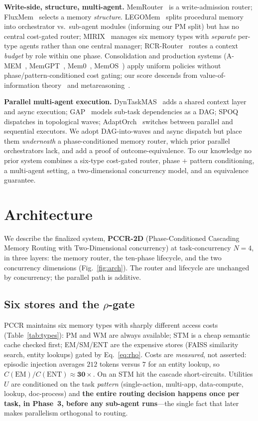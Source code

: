 \documentclass[10pt,twocolumn]{article}
\begin{document}
\textbf{Write-side, structure, multi-agent.} MemRouter~\cite{memrouter} is a write-admission router;
FluxMem~\cite{fluxmem} selects a memory \emph{structure}. LEGOMem~\cite{legomem} splits procedural
memory into orchestrator vs.\ sub-agent modules (informing our PM split) but has no central cost-gated
router; MIRIX~\cite{mirix} manages six memory types with \emph{separate} per-type agents rather than
one central manager; RCR-Router~\cite{rcr} routes a context \emph{budget} by role within one phase.
Consolidation and production systems (A-MEM~\cite{amem}, MemGPT~\cite{memgpt}, Mem0~\cite{mem0},
MemOS~\cite{memos}) apply uniform policies without phase/pattern-conditioned cost gating; our score
descends from value-of-information theory~\cite{voi} and metareasoning~\cite{meta}.

\textbf{Parallel multi-agent execution.} DynTaskMAS~\cite{dyntaskmas} adds a shared context layer and
async execution; GAP~\cite{gap} models sub-task dependencies as a DAG; SPOQ~\cite{spoq} dispatches in
topological waves; AdaptOrch~\cite{adaptorch} switches between parallel and sequential executors. We
adopt DAG-into-waves and async dispatch but place them \emph{underneath} a phase-conditioned memory
router, which prior parallel orchestrators lack, and add a proof of outcome-equivalence. To our
knowledge no prior system combines a six-type cost-gated router, phase $+$ pattern conditioning, a
multi-agent setting, a two-dimensional concurrency model, and an equivalence guarantee.

\section{Architecture}\label{sec:arch}
We describe the finalized system, \textbf{PCCR-2D} (Phase-Conditioned Cascading Memory Routing with
Two-Dimensional concurrency) at task-concurrency $N{=}4$, in three layers: the memory router, the
ten-phase lifecycle, and the two concurrency dimensions (Fig.~\ref{fig:arch}). The router and lifecycle
are unchanged by concurrency; the parallel path is additive.

\subsection{Six stores and the $\rho$-gate}
PCCR maintains six memory types with sharply different access costs (Table~\ref{tab:types}): PM and WM
are always available; STM is a cheap semantic cache checked first; EM/SM/ENT are the expensive stores
(FAISS similarity search, entity lookups) gated by Eq.~\ref{eq:rho}. Costs are \emph{measured}, not
asserted: episodic injection averages $212$ tokens versus $7$ for an entity lookup, so
$C(\text{EM})/C(\text{ENT})\!\approx\!\mathbf{30\times}$. On an STM hit the cascade short-circuits.
Utilities $U$ are conditioned on the task \emph{pattern} (single-action, multi-app, data-compute,
lookup, doc-process) and \textbf{the entire routing decision happens once per task, in Phase~3, before
any sub-agent runs}---the single fact that later makes parallelism orthogonal to routing.
\end{document}
